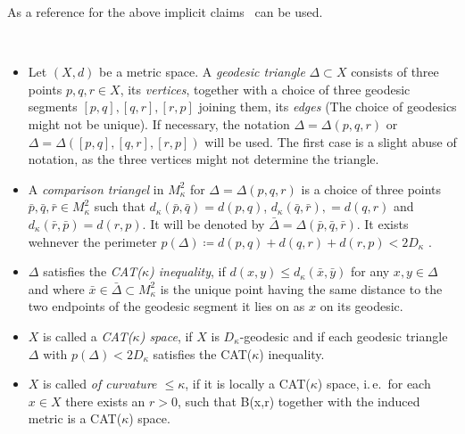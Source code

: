 \begin{rem}
  As a reference for the above implicit claims~\cite[Sec.\ I.2, I.6]{MR1744486} can be used.
\end{rem}

\begin{defin}\
  \begin{itemize}
  \item Let \((X,d)\) be a metric space. A \emph{geodesic triangle} \(\Delta \subset X\) consists of three points \(p,q,r \in X\), its \emph{vertices}, together with a choice of three geodesic segments \([p,q], [q,r], [r, p]\) joining them, its \emph{edges} (The choice of geodesics might not be unique). If necessary, the notation \(\Delta = \Delta(p,q,r)\) or \(\Delta = \Delta([p,q], [q,r], [r,p])\) will be used. The first case is a slight abuse of notation, as the three vertices might not determine the triangle.
  \item A \emph{comparison triangel} in \(M_\kappa^2\) for \(\Delta = \Delta(p,q,r)\) is a choice of three points \(\bar p, \bar q, \bar r \in M_\kappa^2\) such that \(d_\kappa(\bar p, \bar q) = d(p, q)\), \(d_\kappa(\bar q, \bar r), = d(q, r)\) and \(d_\kappa(\bar r, \bar p) = d(r, p)\). It will be denoted by \(\bar \Delta = \Delta(\bar p, \bar q, \bar r)\). It exists wehnever the perimeter \(p(\Delta) \coloneqq d(p,q) + d(q,r) + d(r,p) < 2D_\kappa\) \cite[cf.][Sec.\ I.2]{MR1744486}.
  \item \(\Delta\) satisfies the \emph{CAT(\(\kappa\)) inequality}, if \(d(x,y) \leq d_\kappa(\bar x, \bar y)\) for any \(x, y \in \Delta\) and where \(\bar x \in \bar \Delta \subset M_\kappa^2\) is the unique point having the same distance to the two endpoints of the geodesic segment it lies on as \(x\) on its geodesic.
  \item \(X\) is called a \emph{CAT(\(\kappa\)) space}, if \(X\) is \(D_\kappa\)-geodesic and if each geodesic triangle \(\Delta\) with \(p(\Delta) < 2 D_\kappa\) satisfies the CAT(\(\kappa\)) inequality.
  \item \(X\) is called \emph{of curvature \(\leq \kappa\)}, if it is locally a CAT(\(\kappa\)) space, i.\,e.\ for each \(x \in X\) there exists an \(r > 0\), such that B(x,r) together with the induced metric is a CAT(\(\kappa\)) space.
  \end{itemize}
\end{defin}

